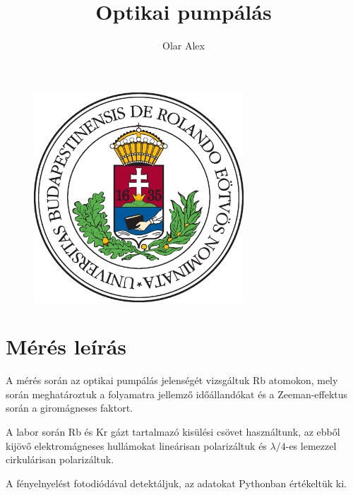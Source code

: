 \documentclass[12pt]{article}
\theoremstyle{plain}
\begin{document}
\title{Optikai pumpálás}
\author{Olar Alex}
\date{}

\maketitle
\vfill
\begin{figure}[h!]
    \begin{center}
    \includegraphics[width=0.7\textwidth]{./images/elte.eps}
    \end{center}
\end{figure}

\newpage

\tableofcontents

\newpage

\section{Mérés leírás}
\par A mérés során az optikai pumpálás jelenségét vizsgáltuk Rb atomokon, mely során meghatároztuk a folyamatra jellemző időállandókat és a Zeeman-effektus során a giromágneses faktort.

\vspace{.5cm}

\par A labor során Rb és Kr gázt tartalmazó kisülési csövet használtunk, az ebből kijövő elektromágneses hullámokat lineárisan polarizáltuk és $\lambda/4$-es lemezzel cirkulárisan polarizáltuk.

\vspace{.5cm}

\par A fényelnyelést fotodiódával detektáljuk, az adatokat Pythonban értékeltük ki.
\end{document}
